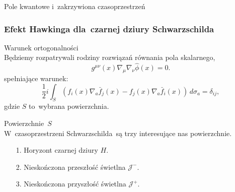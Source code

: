 \documentclass[10pt,t]{beamer}
\begin{document}
\begin{frame}{Pole kwantowe i~zakrzywiona czasoprzestrzeń}
  \frametitle{Efekt Hawkinga dla~czarnej dziury Schwarzschilda}


  Warunek ortogonalności \\
  Będziemy rozpatrywali rodziny rozwiązań równania pola skalarnego,
  \begin{equation}
    \label{eq:Promieniowanie-Hawkinga-15}
    g^{ \mu \nu }( x ) \nabla_{ \mu } \nabla_{ \nu }
    \widehat{ \phi }( x ) = 0.
  \end{equation}
  spełniające warunek:
  \begin{equation}
    \label{eq:Promieniowanie-Hawkinga-16}
    \frac{ 1 }{ 2 } i\int_{ S }( f_{ i }( x )
    \nabla_{ a }\bar{ f }_{ j }( x ) - f_{ j }( x )
    \nabla_{ a } \bar{ f }_{ i }( x ) ) \, d \sigma_{ a }
    = \delta_{ i j },
  \end{equation}
  gdzie $S$ to~wybrana powierzchnia.

  Powierzchnie~$S$ \\
  W~czasoprzestrzeni Schwarzschilda~są trzy interesujące nas
  powierzchnie.
  \begin{itemize}
    \RaggedRight

  \item[1.] Horyzont czarnej dziury $H$.

  \item[2.] Nieskończona przeszłość świetlna $\mathcal{J}^{ - }$.

  \item[3.] Nieskończona przyszłość świetlna $\mathcal{J}^{ + }$.

  \end{itemize}

\end{frame}
\end{document}
